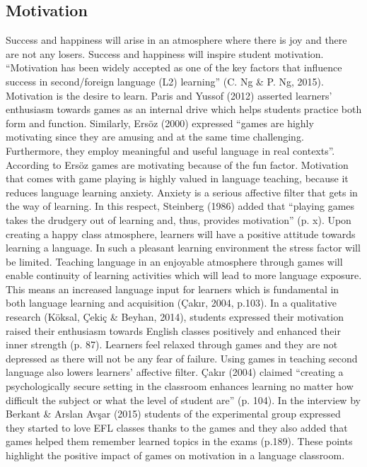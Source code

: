 \documentclass[10pt,twoside,english,a4paper]{article}
\begin{document}
\subsection{Motivation}
Success and happiness will  arise in an atmosphere  where there is joy and  there are not any losers.  Success and happiness will  inspire student motivation. “Motivation has been widely accepted as one of the key factors that influence success in second/foreign language  (L2)  learning”  (C.  Ng \&  P.  Ng,  2015). Motivation  is the  desire  to  learn. Paris  and  Yussof  (2012) asserted  learners’ enthusiasm towards  games as  an internal  drive which  helps students  practice both  form and  function. Similarly,  Ersöz (2000) expressed “games  are highly motivating  since they are  amusing and at  the same time  challenging. Furthermore, they  employ meaningful and useful language in real contexts”.  According to Ersöz games are motivating because of the fun factor. Motivation that comes with game  playing is highly  valued in language teaching,  because it reduces  language learning  anxiety. Anxiety is  a serious affective  filter that  gets in  the way of  learning. In  this respect,  Steinberg (1986)  added that “playing  games takes the drudgery out  of learning  and, thus, provides  motivation” (p. x).  Upon creating a  happy class  atmosphere, learners will  have a positive attitude towards learning a language. In such a pleasant learning environment the stress factor will be limited. Teaching language in an enjoyable atmosphere through games will enable continuity of learning activities which will lead to more language exposure. This means an increased  language input for learners which  is fundamental in both language learning and acquisition (Çakır, 2004, p.103).  In a qualitative research  (Köksal, Çekiç \& Beyhan,  2014), students expressed  their motivation  raised their enthusiasm towards English classes positively and enhanced their inner strength (p. 87). Learners feel relaxed through games and they are not depressed  as there will not  be any fear of failure.  Using games in  teaching second language  also lowers  learners’ affective filter. Çakır (2004) claimed “creating a psychologically secure setting in the classroom enhances learning no matter how difficult the subject or what the level of student are” (p. 104). In the interview by Berkant \& Arslan Avşar (2015) students of the experimental group expressed they started to love EFL classes thanks to the games and they also added that games helped them remember learned topics in the exams (p.189). These points highlight the positive impact of games on motivation in a language classroom. 
\end{document}

